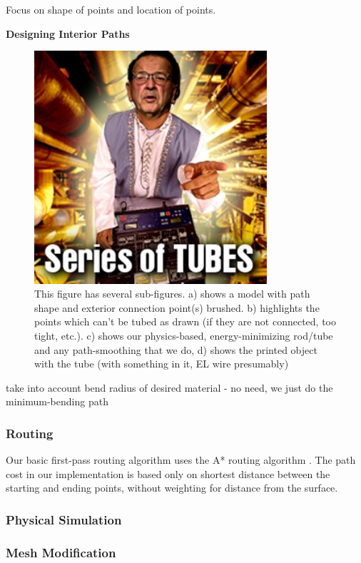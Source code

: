 Focus on shape of points and location of points.

\textbf{Designing Interior Paths}

\begin{figure}[h!]
\centering
    \includegraphics[width=3.4in]{figures/series-of-tubes.jpg}
\caption{This figure has several sub-figures.  a) shows a model with path shape and exterior connection point(s) brushed.  b) highlights the points which can't be tubed as drawn (if they are not connected, too tight, etc.).  c) shows our physics-based, energy-minimizing rod/tube and any path-smoothing that we do, d) shows the printed object with the tube (with something in it, EL wire presumably)}
\label{fig:tool-process-interior}
\end{figure}

take into account bend radius of desired material - no need, we just do the minimum-bending path

\subsubsection{Routing}

Our basic first-pass routing algorithm uses the A* routing algorithm \cite{Hart-Astar}.  The path cost in our implementation is based only on shortest distance between the starting and ending points, without weighting for distance from the surface.

\subsubsection{Physical Simulation}

\subsubsection{Mesh Modification}



